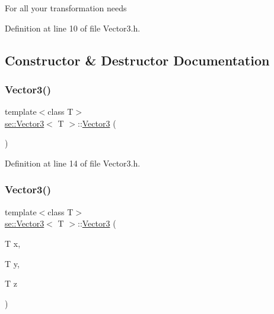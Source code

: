 For all your transformation needs 

Definition at line 10 of file Vector3.\+h.



\subsection{Constructor \& Destructor Documentation}
\mbox{\label{classse_1_1_vector3_a9287277a349e2e99447b3eafe69bff5a}} 
\subsubsection{\texorpdfstring{Vector3()}{Vector3()}\hspace{0.1cm}{\footnotesize\ttfamily [1/2]}}
{\footnotesize\ttfamily template$<$class T$>$ \\
\mbox{\hyperlink{classse_1_1_vector3}{se\+::\+Vector3}}$<$ T $>$\+::\mbox{\hyperlink{classse_1_1_vector3}{Vector3}} (\begin{DoxyParamCaption}{ }\end{DoxyParamCaption})\hspace{0.3cm}{\ttfamily [inline]}}



Definition at line 14 of file Vector3.\+h.

\mbox{\label{classse_1_1_vector3_a6d5f0d6aded9d084a39013c928515724}} 
\subsubsection{\texorpdfstring{Vector3()}{Vector3()}\hspace{0.1cm}{\footnotesize\ttfamily [2/2]}}
{\footnotesize\ttfamily template$<$class T$>$ \\
\mbox{\hyperlink{classse_1_1_vector3}{se\+::\+Vector3}}$<$ T $>$\+::\mbox{\hyperlink{classse_1_1_vector3}{Vector3}} (\begin{DoxyParamCaption}\item[{T}]{x,  }\item[{T}]{y,  }\item[{T}]{z }\end{DoxyParamCaption})\hspace{0.3cm}{\ttfamily [inline]}}



